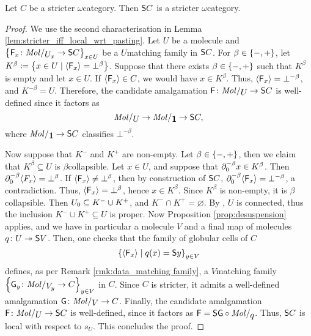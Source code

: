 \begin{thm} \label{thm:suspension_of_stricter}
    Let \( C \) be a stricter \( \omega \)\nbd category.
    Then \( \sus{C} \) is a stricter \( \omega \)\nbd category.
\end{thm}
\begin{proof}
    We use the second characterisation in Lemma \ref{lem:stricter_iff_local_wrt_pasting}.
    Let \( U \) be a molecule and \( \set{\F_x \colon \molecin{\imel{U}{x}} \to \sus{C}}_{x \in U} \) be a \( U \)\nbd matching family in \( \sus{C} \).
    For \( \beta \in \set{-, +} \), let \( K^\beta \eqdef \set{x \in U \mid \pcell{\F_x} = \bot^\beta} \).
    Suppose that there exists \( \beta \in \set{-, +} \) such that \( K^\beta \) is empty and let \( x \in U \).
    If \( \pcell{\F_x} \in C \), we would have \( x \in K^\beta \).
    Thus, \( \pcell{\F_x} = \bot^{-\beta} \), and \( K^{-\beta} = U \).
    Therefore, the candidate amalgamation \( \F \colon \molecin{U} \to \sus{C} \) is well-defined since it factors as
    \begin{equation*}
        \molecin{U} \to \molecin{\pt} \to \sus{C},
    \end{equation*}
    where \( \molecin{\pt} \to \sus{C} \) classifies \( \bot^{-\beta} \).

    Now suppose that \( K^- \) and \( K^+ \) are non-empty.
    Let \( \beta \in \set{-, +} \), then we claim that \( K^\beta \subseteq U \) is \( \beta \)\nbd collapsible.
    Let \( x \in U \), and suppose that \( \bd{0}{-\beta} x \in K^\beta \).
    Then \( \bd{0}{-\beta} \pcell{F_x} = \bot^{\beta} \).
    If \( \pcell{\F_x} \neq \bot^\beta \), then by construction of \( \sus{C} \), \( \bd{0}{-\beta} \pcell{\F_x} = \bot^{-\beta} \), a contradiction.
    Thus, \( \pcell{\F_x} = \bot^\beta \), hence \( x \in K^\beta \).
    Since \( K^\beta \) is non-empty, it is \( \beta \)\nbd collapsible.
    Then  \( \gr{0}{U} \subseteq K^- \cup K^+ \), and \( K^- \cap K^+ = \varnothing \).
    By \cite[Lemma 3.3.13]{hadzihasanovic2024combinatorics}, \( U \) is connected, thus the inclusion \( K^- \cup K^+ \subseteq U \) is proper.
    Now Proposition \ref{prop:desuspension} applies, and we have in particular a molecule \( V \) and a final map of molecules \( q \colon U \surj \sus{V} \). 
    Then, one checks that the family of globular cells of \( C \)
    \begin{equation*}
        \set{\pcell{\F_x} \mid q(x) = \sus{y}}_{y \in V}
    \end{equation*} 
    defines, as per Remark \ref{rmk:data_matching family}, a \( V \)\nbd matching family \( \set{\G_y \colon \molecin{\imel{V}{y}} \to C}_{y \in V} \) in \( C \).
    Since \( C \) is stricter, it admits a well-defined amalgamation \( \G \colon \molecin{V} \to C \).
    Finally, the candidate amalgamation \( \F \colon \molecin{U} \to \sus{C} \) is well-defined, since it factors as \( \F = \sus{\G} \after \molecin{q} \).
    Thus, \( \sus{C} \) is local with respect to \( s_U \).
    This concludes the proof.
\end{proof}

